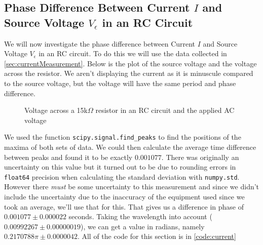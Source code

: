 \documentclass[12pt]{article}
\numberwithin{equation}{section}
\numberwithin{figure}{section}
\begin{document}
    \subsection{Phase Difference Between Current \texorpdfstring{$I$}{I} and Source Voltage \texorpdfstring{$V_\epsilon$}{Ve} in an RC Circuit}\label{sec:current}
    We will now investigate the phase difference between Current $I$ and Source Voltage $V_\epsilon$ in an RC 
    circuit. To do this we will use the data collected in \autoref{sec:currentMeasurement}. Below is the plot 
    of the source voltage and the voltage across the resistor. We aren't displaying the current as it is 
    minuscule compared to the source voltage, but the voltage will have the same period and phase difference.
    \begin{figure}[H]
        \begin{center}
           \caption{Voltage across a 15k$\Omega$ resistor in an RC circuit and the applied AC voltage}
           \label{fig:CurrentPhaseDiff}
        \end{center}
    \end{figure}
    We used the function \texttt{scipy.signal.find\_peaks} to find the positions of the maxima of both 
    sets of data. We could then calculate the average time difference between peaks and found it to be 
    exactly $0.001077$. There was originally an uncertainty on this value but it turned out to be 
    due to rounding errors in \texttt{float64} precision when calculating the standard deviation 
    with \texttt{numpy.std}. However there \textit{must} be some uncertainty to this measurement and since 
    we didn't include the uncertainty due to the inaccuracy of the equipment used since we took an average, 
    we'll use that for this. That gives us a difference in phase of $0.001077\pm 0.000022$ seconds. Taking 
    the wavelength into account ($0.00992267\pm 0.00000019$), we can get a value in radians, namely 
    $0.2170788\pi \pm 0.0000042$. All of the code for this section is in \autoref{code:current}
\end{document}
